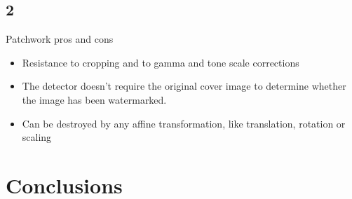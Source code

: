 \documentclass{article}
\begin{document}
	\subsection{2}
	
	Patchwork pros and cons
	
	\begin{itemize}
		\item Resistance to cropping and to gamma and tone scale corrections
		\item The detector doesn’t require the original cover image to determine whether the image has been watermarked.
		\item Can be destroyed by any affine transformation, like translation, rotation or scaling
	\end{itemize}
	
\section{Conclusions}

	
\end{document}

